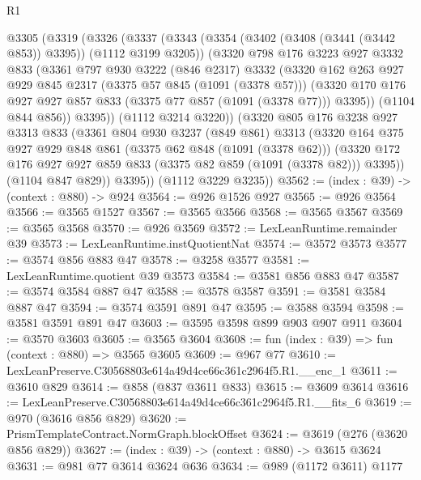 \begin{lexlean}{R1}
\begin{coremodule}
  @3305
    (@3319
      (@3326
        (@3337
          (@3343
            (@3354 (@3402 (@3408 (@3441 (@3442 @853)) @3395)) (@1112 @3199 @3205))
            (@3320
              @798
              @176
              @3223
              @927
              @3332
              @833
              (@3361
                @797
                @930
                @3222
                (@846 @2317)
                @3332
                (@3320
                  @162
                  @263
                  @927
                  @929
                  @845
                  @2317
                  (@3375 @57 @845 (@1091 (@3378 @57)))
                  (@3320 @170 @176 @927 @927 @857 @833 (@3375 @77 @857 (@1091 (@3378 @77))) @3395))
                (@1104 @844 @856))
              @3395))
          (@1112 @3214 @3220))
        (@3320
          @805
          @176
          @3238
          @927
          @3313
          @833
          (@3361
            @804
            @930
            @3237
            (@849 @861)
            @3313
            (@3320
              @164
              @375
              @927
              @929
              @848
              @861
              (@3375 @62 @848 (@1091 (@3378 @62)))
              (@3320 @172 @176 @927 @927 @859 @833 (@3375 @82 @859 (@1091 (@3378 @82))) @3395))
            (@1104 @847 @829))
          @3395))
      (@1112 @3229 @3235))
@3562 := (index : @39) -> (context : @880) -> @924
@3564 := @926 @1526 @927
@3565 := @926 @3564
@3566 := @3565 @1527
@3567 := @3565 @3566
@3568 := @3565 @3567
@3569 := @3565 @3568
@3570 := @926 @3569
@3572 := LexLeanRuntime.remainder @39
@3573 := LexLeanRuntime.instQuotientNat
@3574 := @3572 @3573
@3577 := @3574 @856 @883 @47
@3578 := @3258 @3577
@3581 := LexLeanRuntime.quotient @39 @3573
@3584 := @3581 @856 @883 @47
@3587 := @3574 @3584 @887 @47
@3588 := @3578 @3587
@3591 := @3581 @3584 @887 @47
@3594 := @3574 @3591 @891 @47
@3595 := @3588 @3594
@3598 := @3581 @3591 @891 @47
@3603 := @3595 @3598 @899 @903 @907 @911
@3604 := @3570 @3603
@3605 := @3565 @3604
@3608 := fun (index : @39) => fun (context : @880) => @3565 @3605
@3609 := @967 @77
@3610 := LexLeanPreserve.C30568803e614a49d4ce66c361c2964f5.R1.__enc_1
@3611 := @3610 @829
@3614 := @858 (@837 @3611 @833)
@3615 := @3609 @3614
@3616 := LexLeanPreserve.C30568803e614a49d4ce66c361c2964f5.R1.__fits_6
@3619 := @970 (@3616 @856 @829)
@3620 := PrismTemplateContract.NormGraph.blockOffset
@3624 := @3619 (@276 (@3620 @856 @829))
@3627 := (index : @39) -> (context : @880) -> @3615 @3624
@3631 := @981 @77 @3614 @3624 @636
@3634 := @989 (@1172 @3611) @1177

\end{coremodule}
\end{lexlean}
